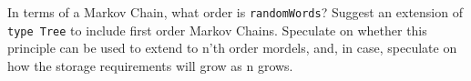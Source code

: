 In terms of a Markov Chain, what order is \lstinline{randomWords}?
Suggest an extension of \lstinline{type Tree} to include first order
Markov Chains. Speculate on whether this principle can be used to
extend to n'th order mordels, and, in case, speculate on how the
storage requirements will grow as n grows.